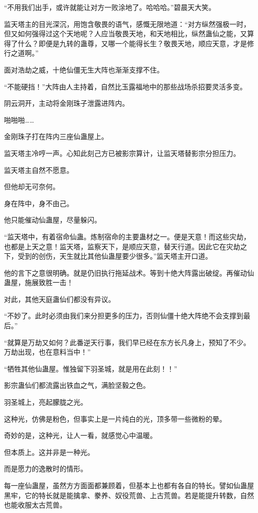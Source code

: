 \begin{this_body}
“不用我们出手，或许就能让对方一败涂地了。哈哈哈。”碧晨天大笑。

监天塔主的目光深沉，用饱含敬畏的语气，感慨无限地道：“对方纵然强极一时，但又如何强得过这个天地呢？人应当敬畏天地，和天地相比，纵然蛊仙之能，又算得了什么？即便是九转的蛊尊，又哪一个能得长生？敬畏天地，顺应天意，才是修行之道啊。”

面对浩劫之威，十绝仙僵无生大阵也渐渐支撑不住。

“不能硬挡！”大阵由人主持着，自然比玉露福地中的那些战场杀招要灵活多变。

阴云洞开，主动将金刚珠子泄露进阵内。

啪啪啪……

金刚珠子打在阵内三座仙蛊屋上。

监天塔主冷哼一声。心知此刻己方已被影宗算计，让监天塔替影宗分担压力。

监天塔主自然不愿意。

但他却无可奈何。

身在阵中，身不由己。

他只能催动仙蛊屋，尽量躲闪。

“监天塔中，有着宿命仙蛊。炼制宿命的主要蛊材之一。便是天意！而这些灾劫，也都是上天之意！监天塔，监察天下，是顺应天意，替天行道。因此它在灾劫之下，受到的创伤，天生就比其他仙蛊屋要少很多。”监天塔主开口道。

他的言下之意很明确。就是仍旧执行拖延战术。等到十绝大阵露出破绽。再催动仙蛊屋，施展致胜一击！

对此，其他天庭蛊仙们都没有异议。

“不妙了。此时必须由我们来分担更多的压力，否则仙僵十绝大阵绝不会支撑到最后。”

“就算是万劫又如何？此番逆天行事，我们早已经在东方长凡身上，预知了不少。万劫出现，也在意料当中！”

“牺牲其他仙蛊屋。惟独留下羽圣城，就是用在此刻！！”

影宗蛊仙们都流露出铁血之气，满脸坚毅之色。

羽圣城上，亮起朦胧之光。

这种光，仿佛是粉色，但事实上是一片纯白的光，顶多带一些微粉的晕。

奇妙的是，这种光，让人一看，就感觉心中温暖。

但本质上。这并非是一种光。

而是愿力的逸散时的情形。

每一座仙蛊屋，虽然方方面面都兼顾着，但基本上也都有各自的特长。譬如仙蛊屋黑牢，它的特长就是能擒拿、豢养、奴役荒兽、上古荒兽。若是能提升转数，自然也能收服太古荒兽。


\end{this_body}
